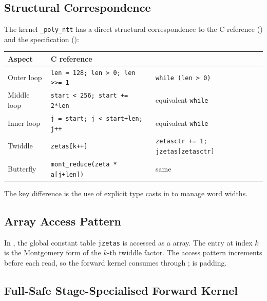 \subsection{Structural Correspondence}

The \jasmin{} kernel \texttt{\_poly\_ntt} has a direct structural
correspondence to the C reference () and the \easycrypt{}
specification ():

\begin{center}
\small
\begin{tabular}{
  >{\raggedright\arraybackslash}p{}
  >{\raggedright\arraybackslash}p{}
  >{\raggedright\arraybackslash}p{}}
\toprule
Aspect & C reference & \jasmin{} \\
\midrule
Outer loop & \texttt{len = 128; len > 0; len >>= 1} &
             \texttt{while (len > 0)} \\
Middle loop & \texttt{start < 256; start += 2*len} &
              equivalent \texttt{while} \\
Inner loop & \texttt{j = start; j < start+len; j++} &
             equivalent \texttt{while} \\
Twiddle & \texttt{zetas[k++]} & \texttt{zetasctr += 1; jzetas[zetasctr]} \\
Butterfly & \texttt{mont\_reduce(zeta * a[j+len])} & same \\
\bottomrule
\end{tabular}
\normalsize
\end{center}

The key difference is the use of explicit type casts in \jasmin{} to manage
word widths.

\subsection{Array Access Pattern}

In \jasmin{}, the global constant table \texttt{jzetas} is accessed as a
 array.  The entry at index $k$ is the Montgomery form of the
$k$-th twiddle factor.  The access pattern increments 
before each read, so the forward kernel consumes  through
;  is padding.

\subsection{Full-Safe Stage-Specialised Forward Kernel}

